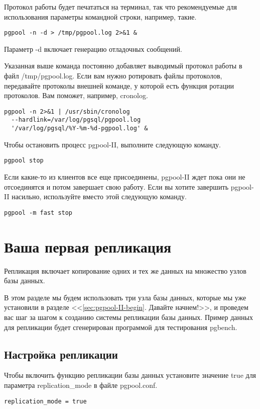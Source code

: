 Протокол работы будет печататься на терминал, так что рекомендуемые для использования параметры командной строки,
например, такие.
\begin{lstlisting}[label=lst:pgpool13,caption=Запуск]
pgpool -n -d > /tmp/pgpool.log 2>&1 &
\end{lstlisting}

Параметр -d включает генерацию отладочных сообщений.

Указанная выше команда постоянно добавляет выводимый протокол работы в файл /tmp/pgpool.log. Если вам нужно
ротировать файлы протоколов, передавайте протоколы внешней команде, у которой есть функция ротации протоколов.
Вам поможет, например, cronolog.
\begin{lstlisting}[label=lst:pgpool14,caption=Запуск]
pgpool -n 2>&1 | /usr/sbin/cronolog
  --hardlink=/var/log/pgsql/pgpool.log
  '/var/log/pgsql/%Y-%m-%d-pgpool.log' &
\end{lstlisting}

Чтобы остановить процесс pgpool-II, выполните следующую команду.
\begin{lstlisting}[label=lst:pgpool15,caption=Остановка]
pgpool stop
\end{lstlisting}

Если какие-то из клиентов все еще присоединены, pgpool-II ждет пока они не отсоединятся и потом завершает свою работу.
Если вы хотите завершить pgpool-II насильно, используйте вместо этой следующую команду.
\begin{lstlisting}[label=lst:pgpool16,caption=Остановка]
pgpool -m fast stop
\end{lstlisting}

\section{Ваша первая репликация}
\label{sec:pgpool-II-replica}
Репликация включает копирование одних и тех же данных на множество узлов базы данных.

В этом разделе мы будем использовать три узла базы данных, которые мы уже установили в разделе
<<\ref{sec:pgpool-II-begin}. Давайте начнем!>>, и проведем вас шаг за шагом к созданию системы репликации базы данных.
Пример данных для репликации будет сгенерирован программой для тестирования pgbench.

\subsection{Настройка репликации}
Чтобы включить функцию репликации базы данных установите значение true для параметра replication\_mode в файле pgpool.conf.
\begin{lstlisting}[label=lst:pgpool17,caption=Настройка репликации]
replication_mode = true
\end{lstlisting}


